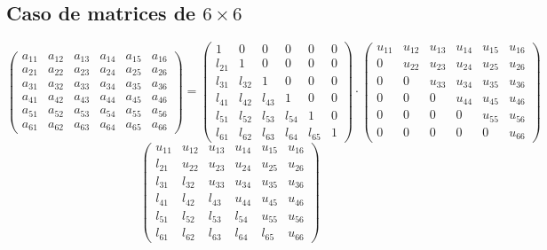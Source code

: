 \documentclass[10pt,a4paper,dvipdfmx]{article}
\begin{document}
\subsection{Caso de matrices de $6\times 6$ }
$$ \left( 
\begin{array}{cccccc}
a_{{1}{1}} & a_{{1}{2}} & a_{{1}{3}} & a_{{1}{4}} & a_{{1}{5}} & a_{{1}{6}} \\
a_{{2}{1}} & a_{{2}{2}} & a_{{2}{3}} & a_{{2}{4}} & a_{{2}{5}} & a_{{2}{6}} \\
a_{{3}{1}} & a_{{3}{2}} & a_{{3}{3}} & a_{{3}{4}} & a_{{3}{5}} & a_{{3}{6}} \\
a_{{4}{1}} & a_{{4}{2}} & a_{{4}{3}} & a_{{4}{4}} & a_{{4}{5}} & a_{{4}{6}} \\
a_{{5}{1}} & a_{{5}{2}} & a_{{5}{3}} & a_{{5}{4}} & a_{{5}{5}} & a_{{5}{6}} \\
a_{{6}{1}} & a_{{6}{2}} & a_{{6}{3}} & a_{{6}{4}} & a_{{6}{5}} & a_{{6}{6}} 
 \end{array}
\right)
 = \left( 
\begin{array}{cccccc}
1 & 0 & 0 & 0 & 0 & 0 \\
l_{{2}{1}} & 1 & 0 & 0 & 0 & 0 \\
l_{{3}{1}} & l_{{3}{2}} & 1 & 0 & 0 & 0 \\
l_{{4}{1}} & l_{{4}{2}} & l_{{4}{3}} & 1 & 0 & 0 \\
l_{{5}{1}} & l_{{5}{2}} & l_{{5}{3}} & l_{{5}{4}} & 1 & 0 \\
l_{{6}{1}} & l_{{6}{2}} & l_{{6}{3}} & l_{{6}{4}} & l_{{6}{5}} & 1 
 \end{array}
\right)
 \cdot \left( 
\begin{array}{cccccc}
u_{{1}{1}} & u_{{1}{2}} & u_{{1}{3}} & u_{{1}{4}} & u_{{1}{5}} & u_{{1}{6}} \\
0 & u_{{2}{2}} & u_{{2}{3}} & u_{{2}{4}} & u_{{2}{5}} & u_{{2}{6}} \\
0 & 0 & u_{{3}{3}} & u_{{3}{4}} & u_{{3}{5}} & u_{{3}{6}} \\
0 & 0 & 0 & u_{{4}{4}} & u_{{4}{5}} & u_{{4}{6}} \\
0 & 0 & 0 & 0 & u_{{5}{5}} & u_{{5}{6}} \\
0 & 0 & 0 & 0 & 0 & u_{{6}{6}} 
 \end{array}
\right)
 $$
$$ \left( 
\begin{array}{cccccc}
u_{{1}{1}} & u_{{1}{2}} & u_{{1}{3}} & u_{{1}{4}} & u_{{1}{5}} & u_{{1}{6}} \\
l_{{2}{1}} & u_{{2}{2}} & u_{{2}{3}} & u_{{2}{4}} & u_{{2}{5}} & u_{{2}{6}} \\
l_{{3}{1}} & l_{{3}{2}} & u_{{3}{3}} & u_{{3}{4}} & u_{{3}{5}} & u_{{3}{6}} \\
l_{{4}{1}} & l_{{4}{2}} & l_{{4}{3}} & u_{{4}{4}} & u_{{4}{5}} & u_{{4}{6}} \\
l_{{5}{1}} & l_{{5}{2}} & l_{{5}{3}} & l_{{5}{4}} & u_{{5}{5}} & u_{{5}{6}} \\
l_{{6}{1}} & l_{{6}{2}} & l_{{6}{3}} & l_{{6}{4}} & l_{{6}{5}} & u_{{6}{6}} 
 \end{array}
\right)
 $$
\end{document}
